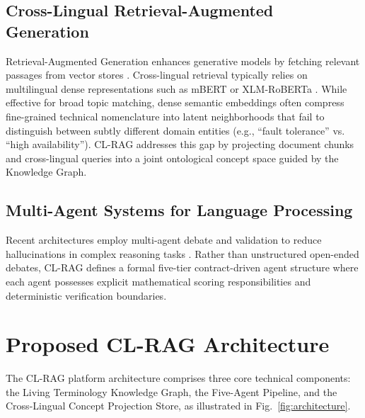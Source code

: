 \documentclass[conference]{IEEEtran}
\begin{document}
\subsection{Cross-Lingual Retrieval-Augmented Generation}
Retrieval-Augmented Generation enhances generative models by fetching relevant passages from vector stores \cite{lewis2020retrieval}. Cross-lingual retrieval typically relies on multilingual dense representations such as mBERT or XLM-RoBERTa \cite{conneau2020unsupervised}. While effective for broad topic matching, dense semantic embeddings often compress fine-grained technical nomenclature into latent neighborhoods that fail to distinguish between subtly different domain entities (e.g., ``fault tolerance'' vs. ``high availability''). CL-RAG addresses this gap by projecting document chunks and cross-lingual queries into a joint ontological concept space guided by the Knowledge Graph.

\subsection{Multi-Agent Systems for Language Processing}
Recent architectures employ multi-agent debate and validation to reduce hallucinations in complex reasoning tasks \cite{du2023improving}. Rather than unstructured open-ended debates, CL-RAG defines a formal five-tier contract-driven agent structure where each agent possesses explicit mathematical scoring responsibilities and deterministic verification boundaries.

\section{Proposed CL-RAG Architecture}

The CL-RAG platform architecture comprises three core technical components: the Living Terminology Knowledge Graph, the Five-Agent Pipeline, and the Cross-Lingual Concept Projection Store, as illustrated in Fig.~\ref{fig:architecture}.
\end{document}
